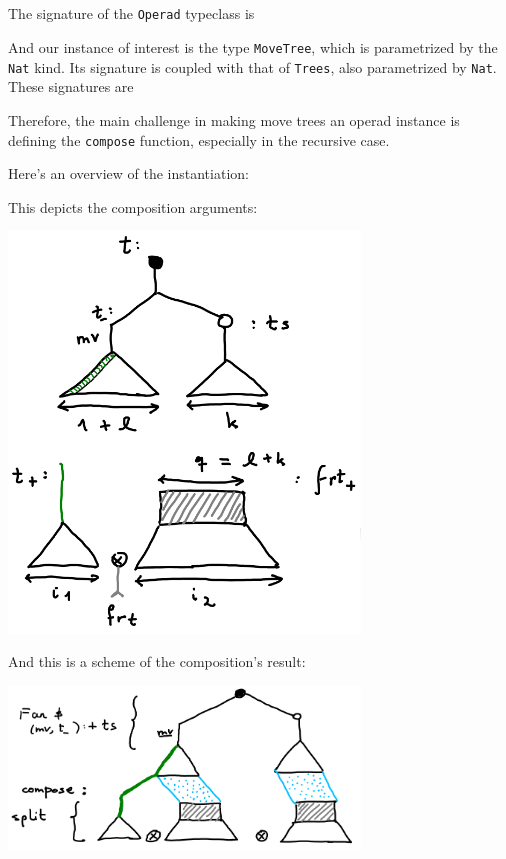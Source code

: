 \documentclass{amsart}
\begin{document}
\newpage

\subsection{} 

The signature of the \texttt{Operad} typeclass is



\bigskip
\bigskip

And our instance of interest is the type \texttt{MoveTree}, which is
parametrized by the \texttt{Nat} kind. Its signature is coupled with
that of \texttt{Trees}, also parametrized by \texttt{Nat}. These signatures
are



\bigskip
\bigskip

Therefore, the main challenge in making move trees an operad instance is
defining the \texttt{compose} function, especially in the recursive case.

\bigskip

Here's an overview of the instantiation:



This depicts the composition arguments:

\includegraphics[width=0.7\textwidth]{bigPic.png}

And this is a scheme of the composition's result:

\includegraphics[width=0.7\textwidth]{result.png}
\end{document}
